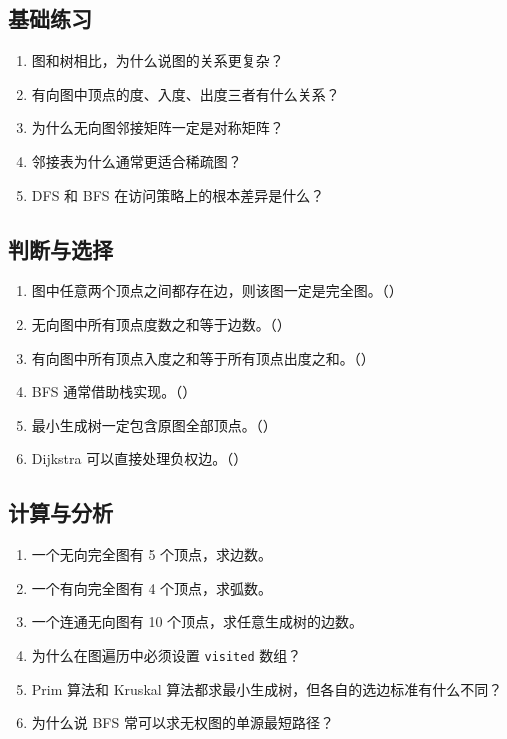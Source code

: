 \documentclass{../../note}
\begin{document}
\subsection{基础练习}

\begin{enumerate}
  \item 图和树相比，为什么说图的关系更复杂？
  \item 有向图中顶点的度、入度、出度三者有什么关系？
  \item 为什么无向图邻接矩阵一定是对称矩阵？
  \item 邻接表为什么通常更适合稀疏图？
  \item DFS 和 BFS 在访问策略上的根本差异是什么？
\end{enumerate}

\subsection{判断与选择}

\begin{enumerate}
  \item 图中任意两个顶点之间都存在边，则该图一定是完全图。（\hspace{1cm}）
  \item 无向图中所有顶点度数之和等于边数。（\hspace{1cm}）
  \item 有向图中所有顶点入度之和等于所有顶点出度之和。（\hspace{1cm}）
  \item BFS 通常借助栈实现。（\hspace{1cm}）
  \item 最小生成树一定包含原图全部顶点。（\hspace{1cm}）
  \item Dijkstra 可以直接处理负权边。（\hspace{1cm}）
\end{enumerate}

\subsection{计算与分析}

\begin{enumerate}
  \item 一个无向完全图有 5 个顶点，求边数。
  \item 一个有向完全图有 4 个顶点，求弧数。
  \item 一个连通无向图有 10 个顶点，求任意生成树的边数。
  \item 为什么在图遍历中必须设置 \texttt{visited} 数组？
  \item Prim 算法和 Kruskal 算法都求最小生成树，但各自的选边标准有什么不同？
  \item 为什么说 BFS 常可以求无权图的单源最短路径？
\end{enumerate}
\end{document}
